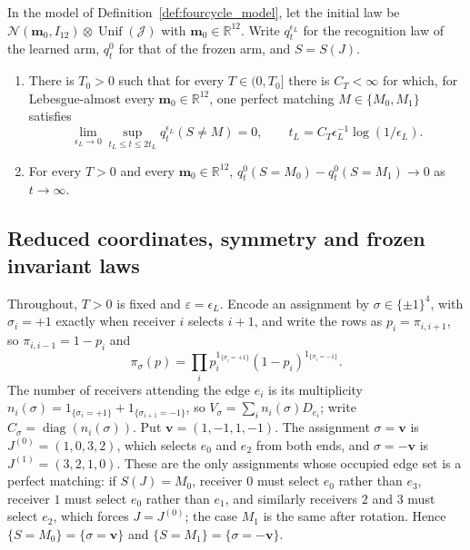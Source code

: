 \begin{theorem}\label{thm:pairing_selection}
In the model of Definition~\ref{def:fourcycle_model}, let the initial law be $\mathcal N(\mathbf m_0,I_{12})\otimes\operatorname{Unif}(\mathcal J)$ with $\mathbf m_0\in\mathbb R^{12}$. Write $q^{\epsilon_L}_t$ for the recognition law of the learned arm, $q^0_t$ for that of the frozen arm, and $S=S(J)$.
\begin{enumerate}
\item[(i)] There is $T_0>0$ such that for every $T\in(0,T_0]$ there is $C_T<\infty$ for which, for Lebesgue-almost every $\mathbf m_0\in\mathbb R^{12}$, one perfect matching $M\in\{M_0,M_1\}$ satisfies
\[
\lim_{\epsilon_L\to0}\sup_{t_L\le t\le2t_L}q^{\epsilon_L}_t(S\ne M)=0,
\qquad
t_L=C_T\epsilon_L^{-1}\log(1/\epsilon_L).
\]
\item[(ii)] For every $T>0$ and every $\mathbf m_0\in\mathbb R^{12}$, $q^0_t(S=M_0)-q^0_t(S=M_1)\to0$ as $t\to\infty$.
\end{enumerate}
\end{theorem}

\subsection{Reduced coordinates, symmetry and frozen invariant laws}\label{app:sel_reduced}

Throughout, $T>0$ is fixed and $\varepsilon=\epsilon_L$. Encode an assignment by $\sigma\in\{\pm1\}^4$, with $\sigma_i=+1$ exactly when receiver $i$ selects $i+1$, and write the rows as $p_i=\pi_{i,i+1}$, so $\pi_{i,i-1}=1-p_i$ and
\[
\pi_\sigma(p)=\prod_ip_i^{1_{\{\sigma_i=+1\}}}(1-p_i)^{1_{\{\sigma_i=-1\}}}.
\]
The number of receivers attending the edge $e_i$ is its multiplicity $n_i(\sigma)=1_{\{\sigma_i=+1\}}+1_{\{\sigma_{i+1}=-1\}}$, so $V_\sigma=\sum_in_i(\sigma)D_{e_i}$; write $C_\sigma=\operatorname{diag}(n_i(\sigma))$. Put $\mathbf v=(1,-1,1,-1)$. The assignment $\sigma=\mathbf v$ is $J^{(0)}=(1,0,3,2)$, which selects $e_0$ and $e_2$ from both ends, and $\sigma=-\mathbf v$ is $J^{(1)}=(3,2,1,0)$. These are the only assignments whose occupied edge set is a perfect matching: if $S(J)=M_0$, receiver $0$ must select $e_0$ rather than $e_3$, receiver $1$ must select $e_0$ rather than $e_1$, and similarly receivers $2$ and $3$ must select $e_2$, which forces $J=J^{(0)}$; the case $M_1$ is the same after rotation. Hence $\{S=M_0\}=\{\sigma=\mathbf v\}$ and $\{S=M_1\}=\{\sigma=-\mathbf v\}$.

